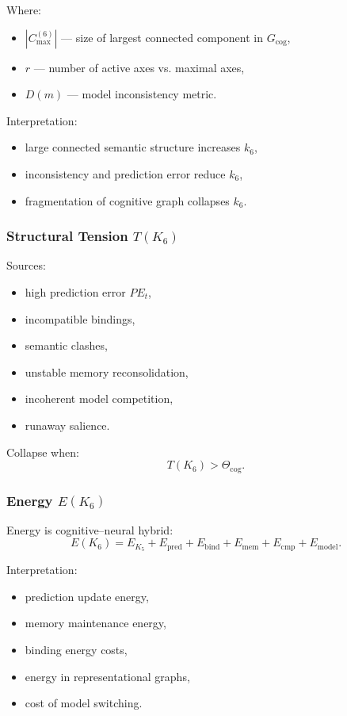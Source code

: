 Where:
\begin{itemize}
    \item $|C_{\max}^{(6)}|$ — size of largest connected component in $G_{\mathrm{cog}}$,
    \item $r$ — number of active axes vs. maximal axes,
    \item $D(m)$ — model inconsistency metric.
\end{itemize}

Interpretation:
\begin{itemize}
    \item large connected semantic structure increases $k_6$,
    \item inconsistency and prediction error reduce $k_6$,
    \item fragmentation of cognitive graph collapses $k_6$.
\end{itemize}

\subsubsection{Structural Tension \texorpdfstring{$T(K_6)$}{T(K_6)}}

Sources:
\begin{itemize}
    \item high prediction error $PE_t$,
    \item incompatible bindings,
    \item semantic clashes,
    \item unstable memory reconsolidation,
    \item incoherent model competition,
    \item runaway salience.
\end{itemize}

Collapse when:
\[
T(K_6) > \Theta_{\mathrm{cog}}.
\]

\subsubsection{Energy \texorpdfstring{$E(K_6)$}{E(K_6)}}

Energy is cognitive–neural hybrid:
\[
E(K_6)
= E_{K_5}
+ E_{\mathrm{pred}}
+ E_{\mathrm{bind}}
+ E_{\mathrm{mem}}
+ E_{\mathrm{cmp}}
+ E_{\mathrm{model}}.
\]

Interpretation:
\begin{itemize}
    \item prediction update energy,
    \item memory maintenance energy,
    \item binding energy costs,
    \item energy in representational graphs,
    \item cost of model switching.
\end{itemize}

